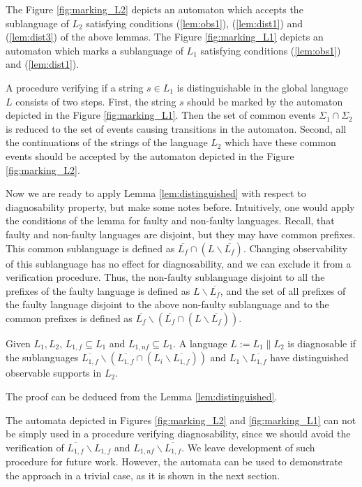 \documentclass[letterpaper, 10pt, conference]{ieeeconf}
\begin{document}
The Figure \ref{fig:marking_L2} depicts an automaton which
accepts the sublanguage of $L_2$ satisfying conditions (\ref{lem:obs1}),
(\ref{lem:dist1}) and (\ref{lem:dist3}) of the above lemmas.
The Figure \ref{fig:marking_L1} depicts an automaton which
marks a sublanguage of $L_1$ satisfying conditions (\ref{lem:obs1}) and
(\ref{lem:dist1}). 

A procedure verifying if a string $s \in L_1$ is distinguishable in the global
language $L$ consists of two steps. First, the string $s$ should be marked by
the automaton depicted in the Figure \ref{fig:marking_L1}. Then the set of
common events $\Sigma_1 \cap \Sigma_2$ is reduced to the set of events causing
transitions in the automaton. Second, all the continuations of the strings of
the language $L_2$ which have these common events should be accepted by the
automaton depicted in the Figure
\ref{fig:marking_L2}.

Now we are ready to apply Lemma \ref{lem:distinguished} with respect to
diagnosability property, but make some notes before. Intuitively, one would
apply the conditions of the lemma for faulty and non-faulty languages. Recall,
that faulty and non-faulty languages are disjoint, but they may have common
prefixes. This common sublanguage is defined as $\overline{L_{f}} \cap (L
\backslash \overline{L_{f}})$. Changing observability of this sublanguage has no
effect for diagnosability, and we can exclude it from a verification procedure.
Thus, the non-faulty sublanguage disjoint to all the prefixes of the faulty
language is defined as $L \backslash \overline{L_f}$, and the set of all
prefixes of the faulty language disjoint to the above non-faulty sublanguage and
to the common prefixes is defined as $\overline{L_f} \backslash (\overline{L_f}
\cap (L \backslash \overline{L_f}))$.

\begin{lemma}
\label{lem:diagnosable}
Given $L_1, L_2$, $L_{1,f} \subseteq L_1$ and $L_{1,nf} \subseteq L_1$. A
language $L := L_1 \parallel L_2$ is diagnosable if the sublanguages
$\overline{L_{1,f}} \backslash (\overline{L_{1,f}} \cap (L_i \backslash
\overline{L_{1,f}}))$ and $L_{1} \backslash \overline{L_{1,f}}$ have
distinguished observable supports in $L_2$.
\end{lemma}
The proof can be deduced from the Lemma \ref{lem:distinguished}. 

The automata depicted in Figures \ref{fig:marking_L2} and
\ref{fig:marking_L1} can not be simply used in a procedure verifying
diagnosability, since we should avoid the verification of $\overline{L_{1,f}}
\backslash L_{1,f}$ and $L_{1,nf} \backslash \overline{L_{1,f}}$. We leave
development of such procedure for future work. However, the automata can be
used to demonstrate the approach in a trivial case, as it is shown in the next
section.
\end{document}
